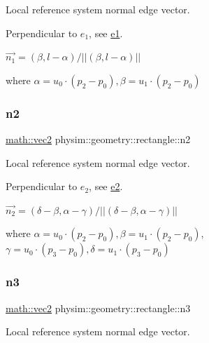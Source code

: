 Local reference system normal edge vector. 

Perpendicular to $e_1$, see \hyperlink{classphysim_1_1geometry_1_1rectangle_a2cf9abe7981c380a6611908735846078}{e1}.

$\vec{n_1} = (\beta, l - \alpha)/ || (\beta, l - \alpha) || $

where $\alpha = u_0\cdot(p_2-p_0), \beta = u_1\cdot(p_2-p_0)$ \mbox{\label{classphysim_1_1geometry_1_1rectangle_a91dcc20f1b6ad5c5825b5198a57870ea}} 
\subsubsection{\texorpdfstring{n2}{n2}}
{\footnotesize\ttfamily \hyperlink{structphysim_1_1math_1_1vec2}{math\+::vec2} physim\+::geometry\+::rectangle\+::n2\hspace{0.3cm}{\ttfamily [private]}}



Local reference system normal edge vector. 

Perpendicular to $e_2$, see \hyperlink{classphysim_1_1geometry_1_1rectangle_afb0095ec1886e7f8e85b69d995c07d2d}{e2}.

$\vec{n_2} = (\delta - \beta, \alpha - \gamma)/ || (\delta - \beta, \alpha - \gamma) || $

where $\alpha = u_0\cdot(p_2-p_0), \beta = u_1\cdot(p_2-p_0)$, $\gamma = u_0\cdot(p_3-p_0), \delta = u_1\cdot(p_3-p_0)$ \mbox{\label{classphysim_1_1geometry_1_1rectangle_a09fc746421e9f033737733a0be27f204}} 
\subsubsection{\texorpdfstring{n3}{n3}}
{\footnotesize\ttfamily \hyperlink{structphysim_1_1math_1_1vec2}{math\+::vec2} physim\+::geometry\+::rectangle\+::n3\hspace{0.3cm}{\ttfamily [private]}}



Local reference system normal edge vector. 

